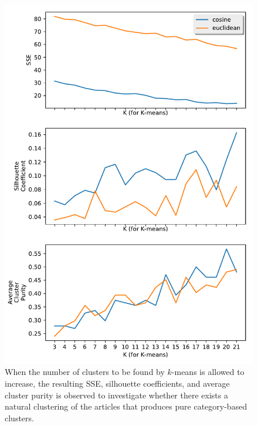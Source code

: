 \documentclass[11pt]{article}
\begin{document}
\begin{figure}[h!] \label{fig:something}
  \centering
  \includegraphics[height=0.6\textheight]{figures/hw3/natural_clusters}
  \caption{When the number of clusters to be found by $k$-means is allowed to increase, the resulting SSE, silhouette coefficients, and average cluster purity is observed to investigate whether there exists a natural clustering of the articles that produces pure category-based clusters.}
\end{figure}


\end{document}
